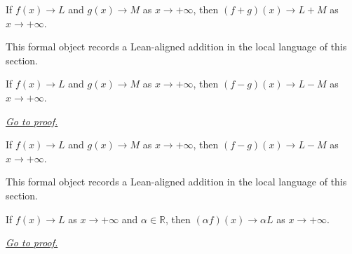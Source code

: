 \begin{remark*}
If $f(x)\to L$ and $g(x)\to M$ as $x\to+\infty$, then $(f+g)(x)\to L+M$ as $x\to+\infty$.
\end{remark*}

\begin{remark*}[Interpretation]
This formal object records a Lean-aligned addition in the local language of this section.
\end{remark*}

\begin{dependencies}
\NoLocalDependencies
\end{dependencies}
\begin{theorem}
\label{thm:tendsto-infty-sub}
If $f(x)\to L$ and $g(x)\to M$ as $x\to+\infty$, then $(f-g)(x)\to L-M$ as $x\to+\infty$.

\smallskip
\noindent
\hyperref[prf:tendsto-infty-sub]{\textit{Go to proof.}}
\end{theorem}

\begin{remark*}
If $f(x)\to L$ and $g(x)\to M$ as $x\to+\infty$, then $(f-g)(x)\to L-M$ as $x\to+\infty$.
\end{remark*}

\begin{remark*}[Interpretation]
This formal object records a Lean-aligned addition in the local language of this section.
\end{remark*}

\begin{dependencies}
\NoLocalDependencies
\end{dependencies}
\begin{theorem}
\label{thm:tendsto-infty-scalar}
If $f(x)\to L$ as $x\to+\infty$ and $\alpha\in\mathbb R$, then $(\alpha f)(x)\to\alpha L$ as $x\to+\infty$.

\smallskip
\noindent
\hyperref[prf:tendsto-infty-scalar]{\textit{Go to proof.}}
\end{theorem}

